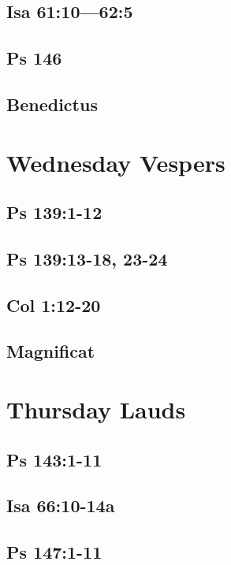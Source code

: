 \subsection{Isa 61:10—62:5}

\subsection{Ps 146}

\subsection{Benedictus}


\section{Wednesday Vespers}

\subsection{Ps 139:1-12}

\subsection{Ps 139:13-18, 23-24}

\subsection{Col 1:12-20}

\subsection{Magnificat}


\section{Thursday Lauds}

\subsection{Ps 143:1-11}

\subsection{Isa 66:10-14a}

\subsection{Ps 147:1-11}

